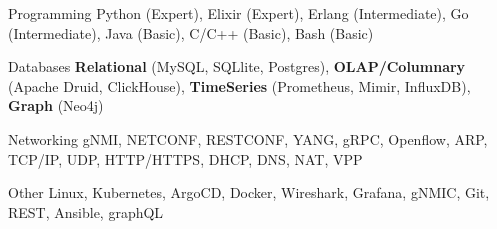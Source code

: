 

\begin{cvskills}

  \cvskill
    {Programming} %
    {Python (Expert), Elixir (Expert), Erlang (Intermediate), Go (Intermediate), Java (Basic), C/C++ (Basic), Bash (Basic)} %

  \cvskill
    {Databases} %
    {\textbf{Relational}     (MySQL, SQLlite, Postgres),
     \textbf{OLAP/Columnary} (Apache Druid, ClickHouse),
     \textbf{TimeSeries}     (Prometheus, Mimir, InfluxDB),
     \textbf{Graph}          (Neo4j)} %

  \cvskill
    {Networking} %
    {gNMI, NETCONF, RESTCONF, YANG, gRPC, Openflow, ARP, TCP/IP, UDP, HTTP/HTTPS, DHCP, DNS, NAT, VPP} %

  \cvskill
    {Other} %
    {Linux, Kubernetes, ArgoCD, Docker, Wireshark, Grafana, gNMIC, Git, REST, Ansible, graphQL} %
\end{cvskills}